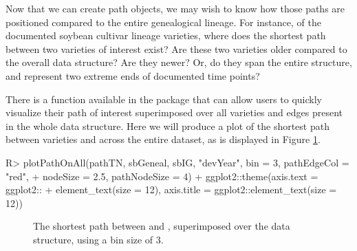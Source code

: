 \documentclass[article,shortnames]{jss}
\begin{document}
Now that we can create path objects, we may wish to know how those paths are positioned compared to the entire genealogical lineage. For instance, of the documented soybean cultivar lineage varieties, where does the shortest path between two varieties of interest exist? Are these two varieties older compared to the overall data structure? Are they newer? Or, do they span the entire structure, and represent two extreme ends of documented time points?

There is a function available in the  package  that can allow users to quickly visualize their path of interest superimposed over all varieties and edges present in the whole data structure. Here we will produce a plot of the shortest path between varieties  and  across the entire dataset, as is displayed in Figure \ref{fig:plotTNBin3}.

\begin{Code}
R> plotPathOnAll(pathTN, sbGeneal, sbIG, "devYear", bin = 3, pathEdgeCol = "red",
+    nodeSize = 2.5, pathNodeSize = 4) + ggplot2::theme(axis.text = ggplot2::
+    element_text(size = 12), axis.title = ggplot2::element_text(size = 12))
\end{Code}

\begin{figure}%
    \centering
    \caption{The shortest path between  and , superimposed over the data structure, using a bin size of 3.}
    \label{fig:plotTNBin3}
\end{figure}
\end{document}
